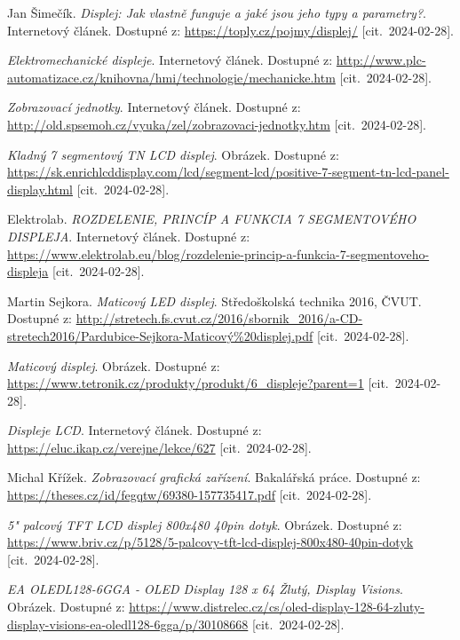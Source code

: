 \documentclass[twoside]{ctuthesis}
\theoremstyle{plain}
\theoremstyle{definition}
\theoremstyle{note}
\begin{document}
\begin{thebibliography}{99}
 Jan Šimečík. {\it Displej: Jak vlastně funguje a jaké jsou jeho typy a parametry?}. Internetový článek. Dostupné z: \url{https://toply.cz/pojmy/displej/} [cit.~2024-02-28].

 {\it Elektromechanické displeje}. Internetový článek. Dostupné z: \url{http://www.plc-automatizace.cz/knihovna/hmi/technologie/mechanicke.htm} [cit.~2024-02-28].

 {\it Zobrazovací jednotky}. Internetový článek. Dostupné z: \url{http://old.spsemoh.cz/vyuka/zel/zobrazovaci-jednotky.htm} [cit.~2024-02-28].

 {\it Kladný 7 segmentový TN LCD displej}. Obrázek. Dostupné z: \url{https://sk.enrichlcddisplay.com/lcd/segment-lcd/positive-7-segment-tn-lcd-panel-display.html} [cit.~2024-02-28].

Elektrolab. {\it ROZDELENIE, PRINCÍP A FUNKCIA 7 SEGMENTOVÉHO DISPLEJA}. Internetový článek. Dostupné z: \url{https://www.elektrolab.eu/blog/rozdelenie-princip-a-funkcia-7-segmentoveho-displeja} [cit.~2024-02-28].

 Martin Sejkora. {\it Maticový LED displej}. Středoškolská technika 2016, ČVUT. Dostupné z: \url{http://stretech.fs.cvut.cz/2016/sbornik_2016/a-CD-stretech2016/Pardubice-Sejkora-Maticový%20displej.pdf} [cit.~2024-02-28].

 {\it Maticový displej}. Obrázek. Dostupné z: \url{https://www.tetronik.cz/produkty/produkt/6_displeje?parent=1} [cit.~2024-02-28].

 {\it Displeje LCD}. Internetový článek. Dostupné z: \url{https://eluc.ikap.cz/verejne/lekce/627} [cit.~2024-02-28].

 Michal Křížek. {\it Zobrazovací grafická zařízení}. Bakalářská práce. Dostupné z: \url{https://theses.cz/id/fegqtw/69380-157735417.pdf} [cit.~2024-02-28].

 {\it 5" palcový TFT LCD displej 800x480 40pin dotyk}. Obrázek. Dostupné z: \url{https://www.briv.cz/p/5128/5-palcovy-tft-lcd-displej-800x480-40pin-dotyk} [cit.~2024-02-28].

 {\it EA OLEDL128-6GGA - OLED Display 128 x 64 Žlutý, Display Visions}. Obrázek. Dostupné z: \url{https://www.distrelec.cz/cs/oled-display-128-64-zluty-display-visions-ea-oledl128-6gga/p/30108668} [cit.~2024-02-28].


\end{thebibliography}
\end{document}
